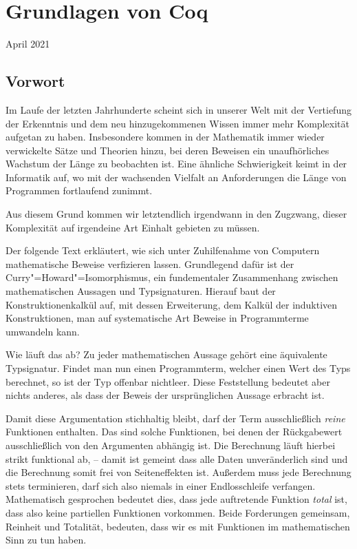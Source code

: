 \documentclass[a4paper,10pt,fleqn,twocolumn,twoside,dvipdfmx]{scrartcl}
\numberwithin{equation}{section}
\begin{document}

\section*{\huge Grundlagen von Coq}

\vspace{1em}\noindent
{\large April 2021}

\tableofcontents

\subsection*{Vorwort}

Im Laufe der letzten Jahrhunderte scheint sich in unserer Welt mit der
Vertiefung der Erkenntnis und dem neu hinzugekommenen Wissen immer mehr
Komplexität aufgetan zu haben. Insbesondere kommen in der Mathematik
immer wieder verwickelte Sätze und Theorien hinzu, bei deren Beweisen
ein unaufhörliches Wachstum der Länge zu beobachten ist. Eine ähnliche
Schwierigkeit keimt in der Informatik auf, wo mit der wachsenden
Vielfalt an Anforderungen die Länge von Programmen fortlaufend
zunimmt.

Aus diesem Grund kommen wir letztendlich irgendwann in den Zugzwang,
dieser Komplexität auf irgendeine Art Einhalt gebieten zu müssen.

Der folgende Text erkläutert, wie sich unter Zuhilfenahme von Computern
mathematische Beweise verfizieren lassen. 
Grundlegend dafür ist der Curry"=Howard"=Isomorphismus, ein
fundementaler Zusammenhang zwischen mathematischen Aussagen
und Typsignaturen. Hierauf baut der Konstruktionenkalkül auf,
mit dessen Erweiterung, dem Kalkül der induktiven Konstruktionen,
man auf systematische Art Beweise in Programmterme umwandeln kann.

Wie läuft das ab? Zu jeder mathematischen Aussage gehört eine
äquivalente Typsignatur. Findet man nun einen Programmterm, welcher
einen Wert des Typs berechnet, so ist der Typ offenbar nichtleer.
Diese Feststellung bedeutet aber nichts anderes, als dass der Beweis
der ursprünglichen Aussage erbracht ist.

Damit diese Argumentation stichhaltig bleibt, darf der Term
ausschließlich \emph{reine} Funktionen enthalten. Das sind solche
Funktionen, bei denen der Rückgabewert ausschließlich von den
Argumenten abhängig ist. Die Berechnung läuft hierbei strikt
funktional ab, -- damit ist gemeint dass alle Daten unveränderlich
sind und die Berechnung somit frei von Seiteneffekten ist.
Außerdem muss jede Berechnung stets terminieren, darf sich also niemals
in einer Endlosschleife verfangen. Mathematisch gesprochen bedeutet
dies, dass jede auftretende Funktion \emph{total} ist, dass also keine
partiellen Funktionen vorkommen. Beide Forderungen gemeinsam,
Reinheit und Totalität, bedeuten, dass wir es mit Funktionen
im mathematischen Sinn zu tun haben.
\end{document}

